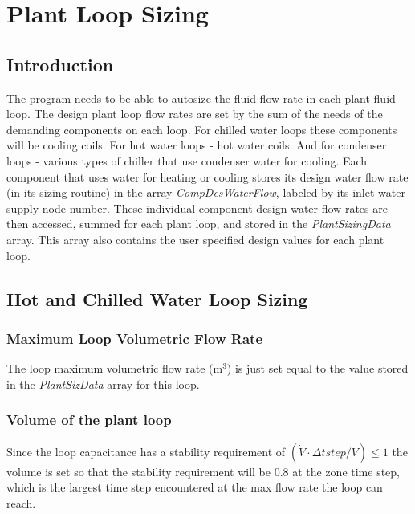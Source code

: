 \section{Plant Loop Sizing}\label{plant-loop-sizing}

\subsection{Introduction}\label{introduction-000}

The program needs to be able to autosize the fluid flow rate in each plant fluid loop. The design plant loop flow rates are set by the sum of the needs of the demanding components on each loop. For chilled water loops these components will be cooling coils. For hot water loops - hot water coils. And for condenser loops - various types of chiller that use condenser water for cooling. Each component that uses water for heating or cooling stores its design water flow rate (in its sizing routine) in the array \emph{CompDesWaterFlow}, labeled by its inlet water supply node number. These individual component design water flow rates are then accessed, summed for each plant loop, and stored in the \emph{PlantSizingData} array. This array also contains the user specified design values for each plant loop.

\subsection{Hot and Chilled Water Loop Sizing}\label{hot-and-chilled-water-loop-sizing}

\subsubsection{Maximum Loop Volumetric Flow Rate}\label{maximum-loop-volumetric-flow-rate}

The loop maximum volumetric flow rate (m\(^{3}\)) is just set equal to the value stored in the \emph{PlantSizData} array for this loop.

\subsubsection{Volume of the plant loop}\label{volume-of-the-plant-loop}

Since the loop capacitance has a stability requirement of \((\dot V\cdot \Delta tstep/V) \le 1\) the volume is set so that the stability requirement will be 0.8 at the zone time step, which is the largest time step encountered at the max flow rate the loop can reach.

